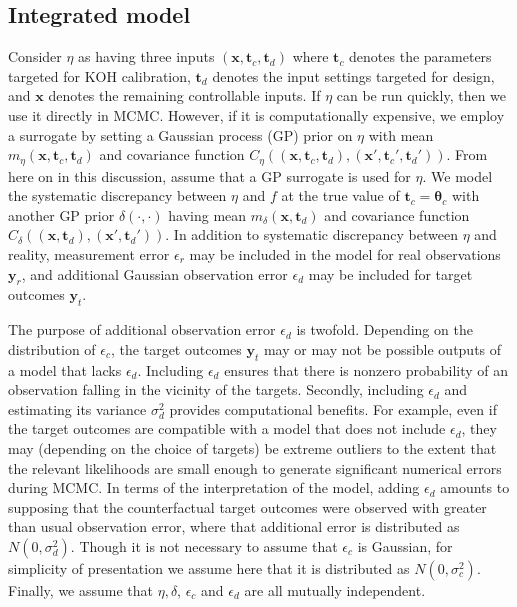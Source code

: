 \documentclass[10pt]{asme2ej}
\begin{document}
\subsection{Integrated model}
%
Consider $\eta$ as having three inputs $(\mathbf x,\mathbf t_c,\mathbf t_d)$ where $\mathbf t_c$ denotes the parameters targeted for KOH calibration, $\mathbf t_d$ denotes the input settings targeted for design, and $\mathbf x$ denotes the remaining controllable inputs.
%
If $\eta$ can be run quickly, then we use it directly in MCMC.
%
However, if it is computationally expensive, we employ a surrogate by setting a Gaussian process (GP) prior on $\eta$ with mean $m_\eta(\mathbf x,\mathbf t_c,\mathbf t_d)$ and covariance function $C_\eta((\mathbf x,\mathbf t_c,\mathbf t_d),(\mathbf x',\mathbf t_c',\mathbf t_d'))$.
%
From here on in this discussion, assume that a GP surrogate is used for $\eta$.
%
We model the systematic discrepancy between $\eta$ and $f$ at the true value of $\mathbf t_c=\boldsymbol\theta_c$ with another GP prior $\delta(\cdot,\cdot)$ having mean $m_\delta(\mathbf x,\mathbf t_d)$ and covariance function $C_\delta((\mathbf x,\mathbf t_d),(\mathbf x',\mathbf t_d'))$.
%
In addition to systematic discrepancy between $\eta$ and reality, measurement error $\epsilon_r$ may be included in the model for real observations $\mathbf y_r$, and additional Gaussian observation error $\epsilon_d$ may be included for target outcomes $\mathbf y_t$.
%

%
The purpose of additional observation error $\epsilon_d$ is twofold.
%
Depending on the distribution of $\epsilon_c$, the target outcomes $\mathbf y_t$ may or may not be possible outputs of a model that lacks $\epsilon_d$.
%
Including $\epsilon_d$ ensures that there is nonzero probability of an observation falling in the vicinity of the targets.
%
Secondly, including $\epsilon_d$ and estimating its variance $\sigma_d^2$ provides computational benefits.
%
For example, even if the target outcomes are compatible with a model that does not include $\epsilon_d$, they may (depending on the choice of targets) be extreme outliers to the extent that the relevant likelihoods are small enough to generate significant numerical errors during MCMC.
%
In terms of the interpretation of the model, adding $\epsilon_d$ amounts to supposing that the counterfactual target outcomes were observed with greater than usual observation error, where that additional error is distributed as $N(0,\sigma_d^2)$.
%
Though it is not necessary to assume that $\epsilon_c$ is Gaussian, for simplicity of presentation we assume here that it is distributed as $N(0,\sigma^2_c)$.
%
Finally, we assume that $\eta,\delta$, $\epsilon_c$ and $\epsilon_d$ are all mutually independent.
%
\end{document}
